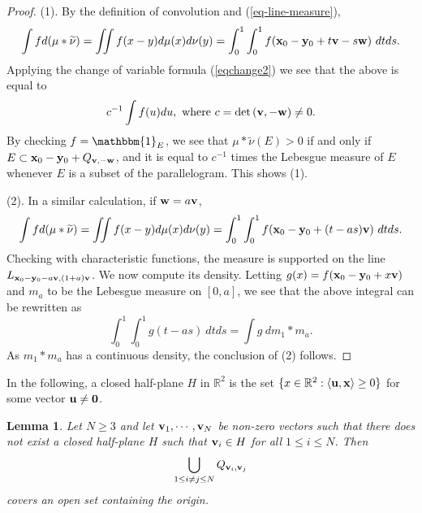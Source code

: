 \documentclass[12pt,a4paper,oneside]{amsart}
\newtheorem{lemma}{Lemma}
\theoremstyle{definition}
\newcommand{\RR}{{\mathbb R}}
\newcommand{\one}{{\mathbbm{1}}}
\newcommand{\wt}[1]{\widetilde{#1}}
\newcounter{rem}
\begin{document}
\begin{proof}
\noindent (1). By the definition of convolution and (\ref{eq-line-measure}), 
$$
\int f d{(\mu\ast\wt\nu)} = \iint f(x-y) d\mu(x)d\nu (y) = \int_0^1\int_0^1 f({\bf x}_0-{\bf y}_{0}+ t{\bf v}-s{\bf w}) ~dtds.
$$
Applying the change of variable formula (\ref{eqchange2}) we see that the above is equal to 
$$
c^{-1}\int f(u) du, \ \mbox{where} \  c = \det\left({\bf v}, -{\bf w}\right)\ne 0.
$$
By checking $f = \one_E$, we see that $\mu\ast\wt\nu(E)>0$  if and only if $E\subset {\bf x}_0-{\bf y}_0 + Q_{\bf v,-w}$, and it is equal to $c^{-1}$ times the Lebesgue measure of $E$ whenever $E$ is a subset of the parallelogram. This shows (1).

\noindent (2). In a similar calculation, if ${\bf w}  = a{\bf v}$, 
$$
\int f d{(\mu\ast\wt\nu)} = \iint f(x-y) d\mu(x)d\nu (y) = \int_0^1\int_0^1 f({\bf x}_0-{\bf y}_{0}+ (t-as){\bf v}) ~dtds.
$$
Checking with characteristic functions, the measure is supported on the line $L_{{\bf x}_0-{\bf y}_{0}-a{\bf v},(1+a){\bf v}}$. We now compute its density.  Letting $g(x) = f({\bf x}_0-{\bf y}_{0}+x{\bf v})$ and $m_a$ to be the Lebesgue measure on $[0,a]$, we see that the above integral can be rewritten as
$$
\int_0^1\int_0^1 g(t-as)~dtds = \int g ~dm_1\ast m_a.
$$
As $m_1\ast m_a$ has a continuous density, the conclusion of (2) follows. 
\end{proof}

In the following, a closed half-plane $H$ in $\RR^2$ is the set $\{x\in\RR^2: \langle{\bf u}, {\bf x}\rangle\ge 0\}$ for some vector ${\bf u} \neq {\bf 0}$. 
\begin{lemma}\label{lemma-covering}
    Let $N\ge 3$ and let  ${\bf v}_1,\cdots,{\bf v}_N$ be non-zero vectors such that there does not exist a closed half-plane $H$ such that ${\bf v}_i\in H$ for all $1\le i\le N$. Then 
    $$
    \bigcup_{1\le i\ne j\le N}Q_{{\bf v}_i,{\bf v}_j}
    $$
    covers an open set containing the origin. 
\end{lemma}
\end{document}
